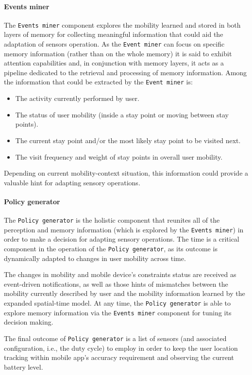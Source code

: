 \documentclass[ENG,PhD]{cinvestav}
\begin{document}
\paragraph{Events miner}
The \texttt{Events miner} component explores the mobility learned and stored in both layers of memory for collecting meaningful information that could aid the adaptation of sensors operation.
As the \texttt{Event miner} can focus on specific memory information (rather than on the whole memory) it is said to exhibit attention capabilities and, in conjunction with memory layers, it acts as a pipeline dedicated to the retrieval and processing of memory information.
Among the information that could be extracted by the \texttt{Event miner} is:
\begin{itemize}
  \item The activity currently performed by user.
  \item The status of user mobility (inside a stay point or moving between stay points).
  \item The current stay point and/or the most likely stay point to be visited next.
  \item The visit frequency and weight of stay points in overall user mobility.
\end{itemize}
Depending on current mobility-context situation, this information could provide a valuable hint for adapting sensory operations.

\paragraph{Policy generator}
The \texttt{Policy generator} is the holistic component that reunites all of the perception and memory information (which is explored by the \texttt{Events miner}) in order to make a decision for adapting sensory operations.
The time is a critical component in the operation of the \texttt{Policy generator}, as its outcome is dynamically adapted to changes in user mobility across time.

The changes in mobility and mobile device's constraints status are received as event-driven notifications, as well as those hints of mismatches between the mobility currently described by user and the mobility information learned by the expanded spatial-time model.
At any time, the \texttt{Policy generator} is able to explore memory information via the \texttt{Events miner} component for tuning its decision making.

The final outcome of \texttt{Policy generator} is a list of sensors (and associated configuration, i.e., the duty cycle) to employ in order to keep the user location tracking within mobile app's accuracy requirement and observing the current battery level.
\end{document}
